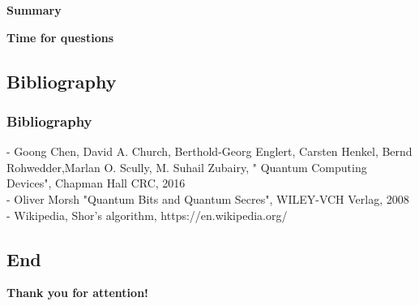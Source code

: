 \begin{frame}
	
	\begin{center}
		\Huge \textbf{Summary}
	\end{center}

\end{frame}

\begin{frame}
	
	\begin{center}
		\Huge \textbf{Time for questions}
	\end{center}

\end{frame}
\subsection{Bibliography}
\begin{frame}
	\frametitle{Bibliography}
	{\normalsize 
	
	\vspace{0,2cm}

{-  Goong Chen, David A. Church, Berthold-Georg Englert, Carsten Henkel, Bernd Rohwedder,Marlan O. Scully, M. Suhail Zubairy, " Quantum Computing Devices", Chapman Hall CRC, 2016}\\
\vspace{0,2cm}
{- Oliver Morsh "Quantum Bits and Quantum Secres", WILEY-VCH Verlag, 2008}\\
\vspace{0,2cm}
{- Wikipedia, Shor's algorithm, https://en.wikipedia.org/}\\

	}
\end{frame}

\subsection{End}
\begin{frame}
	
	\begin{center}
		\Huge \textbf{Thank you for attention!}
	\end{center}

\end{frame}
